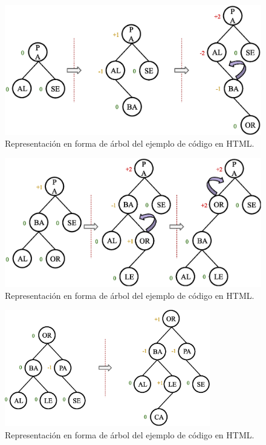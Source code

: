 \begin{figure}[htpb!]
  \begin{center}
    \includegraphics[width=1.0\textwidth]{images/AVLInsertion2.eps}
  \end{center}
  \caption{Representación en forma de árbol del ejemplo de código en HTML.}
  \label{fig:AVLInsertion2}
\end{figure}

\begin{figure}[htpb!]
  \begin{center}
    \includegraphics[width=1.0\textwidth]{images/AVLInsertion3.eps}
  \end{center}
  \caption{Representación en forma de árbol del ejemplo de código en HTML.}
  \label{fig:AVLInsertion3}
\end{figure}

\begin{figure}[htpb!]
  \begin{center}
    \includegraphics[width=0.8\textwidth]{images/AVLInsertion4.eps}
  \end{center}
  \caption{Representación en forma de árbol del ejemplo de código en HTML.}
  \label{fig:AVLInsertion4}
\end{figure}


